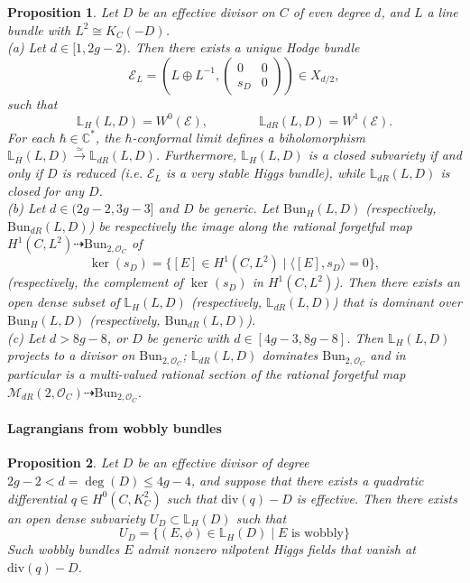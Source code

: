 \documentclass[twoside, 11pt]{article}
\numberwithin{equation}{section}
\theoremstyle{theorem}
\numberwithin{theorem}{section}
\newtheorem{proposition}[proposition]{Proposition}
\theoremstyle{definition}
\begin{document}
\begin{proposition} \label{prop-rank-2-all-range}
Let $D$ be an effective divisor on $C$ of even degree $d$, and $L$ a line bundle with $L^2 \cong K_C(-D)$. \\
(a) Let $d \in [1, 2g-2)$. Then there exists a unique Hodge bundle 
\[\mathcal{E}_L = \left( L \oplus L^{-1}, \left( \begin{smallmatrix} 0 & 0 \\ s_D & 0\end{smallmatrix}\right)\right) \in X_{d/2}, \]    
such that 
\[ \mathbb{L}_H(L, D) = W^0(\mathcal{E}), \qquad \qquad \mathbb{L}_{dR}(L, D) = W^1(\mathcal{E}). \]
For each $\hbar\in \mathbb{C}^\ast$, the $\hbar$-conformal limit defines a biholomorphism $\mathbb{L}_H(L, D) \overset{\simeq}{\rightarrow} \mathbb{L}_{dR}(L, D)$. Furthermore, $\mathbb{L}_H(L, D)$ is a closed subvariety if and only if $D$ is reduced (i.e. $\mathcal{E}_L$ is a very stable Higgs bundle), while $\mathbb{L}_{dR}(L, D)$ is closed for any $D$. \\
(b) Let $d \in (2g-2, 3g-3]$ and $D$ be generic. 
Let $\mathrm{Bun}_{H}(L, D)$ (respectively, $\mathrm{Bun}_{dR}(L, D)$) be respectively the image along the rational forgetful map $H^1(C, L^2) \dashrightarrow \mathrm{Bun}_{2, \mathcal{O}_C}$ of     
\[ \ker(s_D) = \{[E] \in H^1(C, L^2) \mid \langle [E], s_D \rangle = 0 \},  \]
(respectively, the complement of $\ker(s_D)$ in $H^1(C, L^2)$).
Then there exists an open dense subset of $\mathbb{L}_H(L, D)$ (respectively, $\mathbb{L}_{dR}(L, D)$) that is dominant over $\mathrm{Bun}_{H}(L, D)$ (respectively, $\mathrm{Bun}_{dR}(L, D)$).  \\
(c) Let $d > 8g-8$, or $D$ be generic with $d \in [4g-3, 8g-8]$. Then $\mathbb{L}_H(L, D)$ projects to a divisor on $\mathrm{Bun}_{2, \mathcal{O}_C}$; $\mathbb{L}_{dR}(L, D)$ dominates $\mathrm{Bun}_{2, \mathcal{O}_C}$ and in particular is a multi-valued rational section of the rational forgetful map $\mathcal{M}_{dR}(2, \mathcal{O}_C) \dashrightarrow \mathrm{Bun}_{2, \mathcal{O}_C}$.       
\end{proposition}

\paragraph{Lagrangians from wobbly bundles}
\begin{proposition} \label{prop-wobbly-lag}
Let $D$ be an effective divisor of degree $2g-2 < d = \deg(D) \leq 4g-4$, and suppose that there exists a quadratic differential $q \in H^0(C, K_C^2)$ such that $\mathrm{div}(q) - D$ is effective. Then there exists an open dense subvariety $U_D \subset \mathbb{L}_H(D)$ such that 
\[ U_D = \{ (E,\phi) \in \mathbb{L}_H(D) \mid E \text{ is wobbly}\} \]
Such wobbly bundles $E$ admit nonzero nilpotent Higgs fields that vanish at $\mathrm{div}(q) - D$.
\end{proposition}
\end{document}
